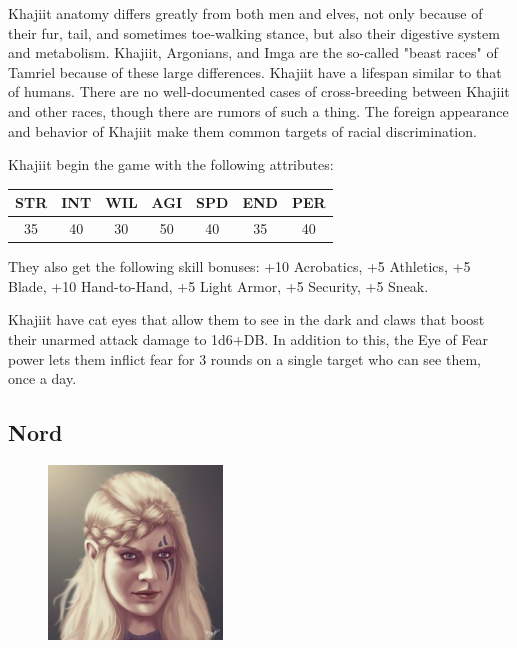 \documentclass[12pt]{book}
\begin{document}
Khajiit anatomy differs greatly from both men and elves, not only because of their fur, tail, and sometimes toe-walking stance, but also their digestive system and metabolism. Khajiit, Argonians, and Imga are the so-called "beast races" of Tamriel because of these large differences. Khajiit have a lifespan similar to that of humans. There are no well-documented cases of cross-breeding between Khajiit and other races, though there are rumors of such a thing. The foreign appearance and behavior of Khajiit make them common targets of racial discrimination.

Khajiit begin the game with the following attributes:
\begin{center}
\begin{tabular}{|c|c|c|c|c|c|c|}
\hline
STR & INT & WIL & AGI & SPD & END & PER\\ \hline
35 & 40 & 30 & 50 & 40 & 35 & 40\\ \hline
\end{tabular}
\end{center}

They also get the following skill bonuses: +10 Acrobatics, +5 Athletics, +5 Blade, +10 Hand-to-Hand, +5 Light Armor, +5 Security, +5 Sneak.

Khajiit have cat eyes that allow them to see in the dark and claws that boost their unarmed attack damage to 1d6+DB. In addition to this, the Eye of Fear power lets them inflict fear for 3 rounds on a single target who can see them, once a day.\\

\subsection{Nord}
\begin{figure}
	\includegraphics[width=\textwidth]{Nord.png}
\end{figure}
\end{document}

